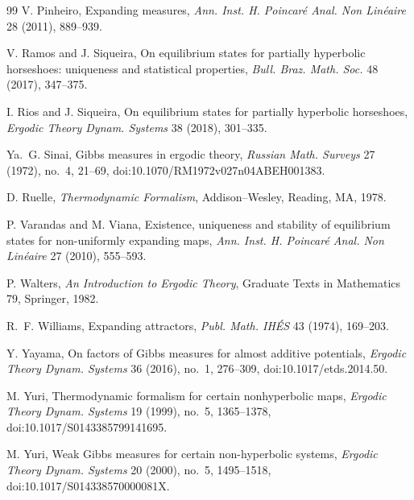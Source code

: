 \documentclass[11pt,a4paper]{article}
\begin{document}
\begin{thebibliography}{99}
V. Pinheiro,
\newblock Expanding measures,
\newblock \emph{Ann. Inst. H. Poincar\'e Anal. Non Lin\'eaire} 28 (2011),
889--939.

V. Ramos and J. Siqueira,
\newblock On equilibrium states for partially hyperbolic horseshoes:
uniqueness and statistical properties,
\newblock \emph{Bull. Braz. Math. Soc.} 48 (2017), 347--375.

I. Rios and J. Siqueira,
\newblock On equilibrium states for partially hyperbolic horseshoes,
\newblock \emph{Ergodic Theory Dynam. Systems} 38 (2018), 301--335.

Ya.~G. Sinai,
\newblock Gibbs measures in ergodic theory,
\newblock \emph{Russian Math. Surveys} 27 (1972), no.~4, 21--69,
\newblock doi:10.1070/RM1972v027n04ABEH001383.

D. Ruelle,
\newblock \emph{Thermodynamic Formalism},
\newblock Addison--Wesley, Reading, MA, 1978.

P. Varandas and M. Viana,
\newblock Existence, uniqueness and stability of equilibrium states for
non-uniformly expanding maps,
\newblock \emph{Ann. Inst. H. Poincar\'e Anal. Non Lin\'eaire} 27 (2010),
555--593.

P. Walters,
\newblock \emph{An Introduction to Ergodic Theory},
\newblock Graduate Texts in Mathematics 79, Springer, 1982.

R.~F. Williams,
\newblock Expanding attractors,
\newblock \emph{Publ. Math. IH\'ES} 43 (1974), 169--203.


Y. Yayama,
\newblock On factors of Gibbs measures for almost additive potentials,
\newblock \emph{Ergodic Theory Dynam. Systems} 36 (2016), no.~1, 276--309,
\newblock doi:10.1017/etds.2014.50.

M. Yuri,
\newblock Thermodynamic formalism for certain nonhyperbolic maps,
\newblock \emph{Ergodic Theory Dynam. Systems} 19 (1999), no.~5, 1365--1378,
\newblock doi:10.1017/S0143385799141695.

M. Yuri,
\newblock Weak Gibbs measures for certain non-hyperbolic systems,
\newblock \emph{Ergodic Theory Dynam. Systems} 20 (2000), no.~5, 1495--1518,
\newblock doi:10.1017/S014338570000081X.

\end{thebibliography}
\end{document}
